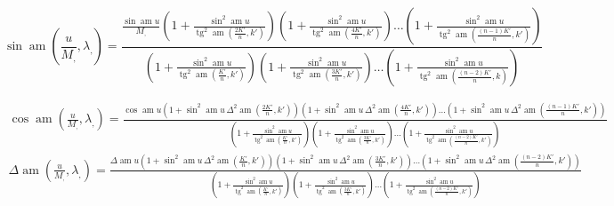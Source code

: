 \documentclass{article}
\begin{document}
\[
\sin\operatorname{am}\left(\frac{u}{M_{,}},\lambda_{,}\right)=\frac{\frac{\sin\operatorname{am}u}{M_{,}}\left(1+\frac{\sin^{2}\operatorname{am}u}{\operatorname{tg}^{2}\operatorname{am}\left(\frac{2K'}{n},k'\right)}\right)\left(1+\frac{\sin^{2}\operatorname{am}u}{\operatorname{tg}^{2}\operatorname{am}\left(\frac{4K'}{n},k'\right)}\right)\ldots\left(1+\frac{\sin^{2}\operatorname{am}u}{\operatorname{tg}^{2}\operatorname{am}\left(\frac{(n-1)K'}{n},k'\right)}\right)}{\left(1+\frac{\sin^{2}\operatorname{am}u}{\operatorname{tg}^{2}\operatorname{am}\left(\frac{K'}{n},k'\right)}\right)\left(1+\frac{\sin^{2}\operatorname{am}u}{\operatorname{tg}^{2}\operatorname{am}\left(\frac{3K'}{n},k'\right)}\right)\ldots\left(1+\frac{\sin^{2}\operatorname{am}u}{\operatorname{tg}^{2}\operatorname{am}\left(\frac{(n-2)K'}{n},k\right)}\right)}
\]

\[
\begin{gathered}
\cos\operatorname{am}\left(\frac{u}{M_{,}},\lambda_{,}\right)=\frac{\cos\operatorname{am}u\left(1+\sin^{2}\operatorname{am}u\,\Delta^{2}\operatorname{am}\left(\frac{2K'}{n},k'\right)\right)\left(1+\sin^{2}\operatorname{am}u\,\Delta^{2}\operatorname{am}\left(\frac{4K'}{n},k'\right)\right)\ldots\left(1+\sin^{2}\operatorname{am}u\,\Delta^{2}\operatorname{am}\left(\frac{(n-1)K'}{n},k'\right)\right)}{\left(1+\frac{\sin^{2}\operatorname{am}u}{\operatorname{tg}^{2}\operatorname{am}\left(\frac{K'}{n},k'\right)}\right)\left(1+\frac{\sin^{2}\operatorname{am}u}{\operatorname{tg}^{2}\operatorname{am}\left(\frac{3K'}{n},k'\right)}\right)\ldots\left(1+\frac{\sin^{2}\operatorname{am}u}{\operatorname{tg}^{2}\operatorname{am}\left(\frac{(n-2)K'}{n},k'\right)}\right)}\\[2.5ex]
\Delta\operatorname{am}\left(\frac{u}{M_{,}},\lambda_{,}\right)=\frac{\Delta\operatorname{am}u\left(1+\sin^{2}\operatorname{am}u\,\Delta^{2}\operatorname{am}\left(\frac{K'}{n},k'\right)\right)\left(1+\sin^{2}\operatorname{am}u\,\Delta^{2}\operatorname{am}\left(\frac{3K'}{n},k'\right)\right)\ldots\left(1+\sin^{2}\operatorname{am}u\,\Delta^{2}\operatorname{am}\left(\frac{(n-2)K'}{n},k'\right)\right)}{\left(1+\frac{\sin^{2}\operatorname{am}u}{\operatorname{tg}^{2}\operatorname{am}\left(\frac{K'}{n},k'\right)}\right)\left(1+\frac{\sin^{2}\operatorname{am}u}{\operatorname{tg}^{2}\operatorname{am}\left(\frac{3K'}{n},k'\right)}\right)\ldots\left(1+\frac{\sin^{2}\operatorname{am}u}{\operatorname{tg}^{2}\operatorname{am}\left(\frac{(n-2)K'}{n},k'\right)}\right)}
\end{gathered}
\]
\end{document}
